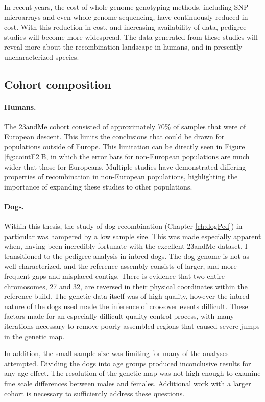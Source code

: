 In recent years, the cost of whole-genome genotyping methods, including SNP microarrays and even whole-genome sequencing, have continuously reduced in cost.
With this reduction in cost, and increasing availability of data, pedigree studies will become more widespread.
The data generated from these studies will reveal more about the recombination landscape in humans, and in presently uncharacterized species.

\subsection{Cohort composition}
\paragraph{Humans.}
The 23andMe cohort consisted of approximately 70\% of samples that were of European descent.
This limits the conclusions that could be drawn for populations outside of Europe.
This limitation can be directly seen in Figure \ref{fig:cointF2}B, in which the error bars for non-European populations are much wider that those for Europeans.
Multiple studies have demonstrated differing properties of recombination in non-European populations\cite{Bleazard2013,Hinch2011,Berg2011}, highlighting the importance of expanding these studies to other populations.

\paragraph{Dogs.}
Within this thesis, the study of dog recombination (Chapter \ref{ch:dogPed}) in particular was hampered by a low sample size.
This was made especially apparent when, having been incredibly fortunate with the excellent 23andMe dataset, I transitioned to the pedigree analysis in inbred dogs.
The dog genome is not as well characterized, and the reference assembly consists of larger, and more frequent gaps and misplaced contigs.
There is evidence that two entire chromosomes, 27 and 32, are reversed in their physical coordinates within the reference build\cite{Wong2010}.
The genetic data itself was of high quality, however the inbred nature of the dogs used made the inference of crossover events difficult.
These factors made for an especially difficult quality control process, with many iterations necessary to remove poorly assembled regions that caused severe jumps in the genetic map.

In addition, the small sample size was limiting for many of the analyses attempted.
Dividing the dogs into age groups produced inconclusive results for any age effect.
The resolution of the genetic map was not high enough to examine fine scale differences between males and females.
Additional work with a larger cohort is necessary to sufficiently address these questions.




